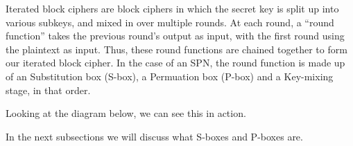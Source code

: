 Iterated block ciphers are block ciphers in which the secret key is split up
into various subkeys, and mixed in over multiple rounds. At each round, a
``round function'' takes the previous round's output as input, with the
first round using the plaintext as input. Thus, these round functions are
chained together to form our iterated block cipher. In the case of an SPN, 
the round function is made up of an Substitution box (S-box), a Permuation box 
(P-box) and a Key-mixing stage, in that order.

Looking at the diagram below, we can see this in action.

In the next subsections we will discuss what S-boxes and P-boxes are.


